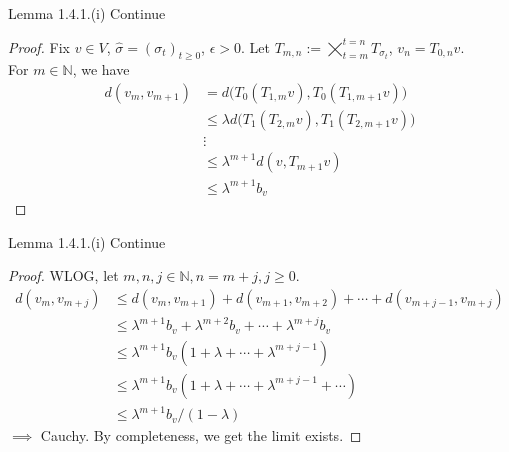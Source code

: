 \documentclass[aspectratio=169]{beamer} %
\begin{document}
\begin{frame}{Lemma 1.4.1.(i) Continue}
\begin{proof}
    Fix $v\in V$, $\hat{\sigma}=(\sigma_t)_{t\ge 0}$, $\epsilon>0$. Let $T_{m,n}:=\bigtimes_{t=m}^{t=n} T_{\sigma_t}$, $v_n = T_{0,n}v$.\\
    For $m\in \mathbb{N}$, we have
    \begin{align*}
        d(v_m,v_{m+1}) &= d\bigg(T_0(T_{1,m} v), T_0(T_{1,m+1}v)\bigg)\\
        &\le \lambda d\bigg(T_1(T_{2,m} v), T_1(T_{2,m+1}v)\bigg)\tag{contraction}\\
        &\vdots\\
        &\le\lambda^{m+1}d(v,T_{m+1}v)\\
        &\le\lambda^{m+1}b_v\tag{bounded}
    \end{align*}
\end{proof}

\end{frame}

\begin{frame}{Lemma 1.4.1.(i) Continue}
    \begin{proof}
        WLOG, let $m,n,j\in\mathbb{N}, n = m+j, j\ge 0$.\\
        \begin{align*}
        d(v_m,v_{m+j}) &\le d(v_m,v_{m+1})+d(v_{m+1},v_{m+2})+\cdots + d(v_{m+j-1},v_{m+j})\tag{$\Delta$ inequality}\\
        &\le \lambda^{m+1}b_v + \lambda^{m+2}b_v+\cdots+\lambda^{m+j}b_v\tag{page 7}\\
        &\le \lambda^{m+1}b_v(1+\lambda+\cdots+\lambda^{m+j-1})\\
        &\le \lambda^{m+1}b_v(1+\lambda+\cdots+\lambda^{m+j-1}+\cdots)\\
        &\le \lambda^{m+1}b_v/(1-\lambda)\tag{geom sum}
    \end{align*}
    $\implies$ Cauchy. By completeness, we get the limit exists.
    \end{proof}
\end{frame}
\end{document}
